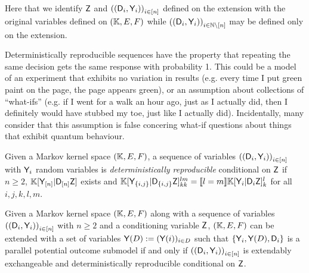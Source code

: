 Here that we identify $\mathsf{Z}$ and $\left((\mathsf{D}_i,\mathsf{Y}_i)\right)_{i\in [n]}$ defined on the extension with the original variables defined on $(\mathbb{K},E,F)$ while $\left((\mathsf{D}_i,\mathsf{Y}_i)\right)_{i\in \mathbb{N}\setminus[n]}$ may be defined only on the extension.

Deterministically reproducible sequences have the property that repeating the same decision gets the same response with probability 1. This could be a model of an experiment that exhibits no variation in results (e.g. every time I put green paint on the page, the page appears green), or an assumption about collections of ``what-ifs'' (e.g. if I went for a walk an hour ago, just as I actually did, then I definitely would have stubbed my toe, just like I actually did). Incidentally, many consider that this assumption is false concering what-if questions about things that exhibit quantum behaviour.

\begin{definition}
Given a Markov kernel space $(\mathbb{K},E,F)$, a sequence of variables $\left((\mathsf{D}_i,\mathsf{Y}_i)\right)_{i\in [n]}$ with $\mathsf{Y}_i$ random variables is \emph{deterministically reproducible} conditional on $\mathsf{Z}$ if $n\geq 2$, $\mathbb{K}[\mathsf{Y}_{[n]}|\mathsf{D}_{[n]}\mathsf{Z}]$ exists and $\mathbb{K}[\mathsf{Y}_{\{i,j\}}|\mathsf{D}_{\{i,j\}}\mathsf{Z}]_{kk}^{lm} = \llbracket l=m \rrbracket \mathbb{K}[\mathsf{Y}_{i}|\mathsf{D}_{i}\mathsf{Z}]_{k}^{l}$ for all $i,j,k,l,m$.
\end{definition}

\begin{theorem}\label{th:cfac_rep}
Given a Markov kernel space $(\mathbb{K},E,F)$ along with a sequence of variables $\left((\mathsf{D}_i,\mathsf{Y}_i)\right)_{i\in [n]}$ with $n\geq 2$ and a conditioning variable $\mathsf{Z}$, $(\mathbb{K},E,F)$ can be extended with a set of variables $\mathsf{Y}(D):=(\mathsf{Y}(i))_{i\in D}$ such that $\{\mathsf{Y}_i, \mathsf{Y}(D), \mathsf{D}_i\}$ is a parallel potential outcome submodel if and only if $\left((\mathsf{D}_i,\mathsf{Y}_i)\right)_{i\in [n]}$ is extendably exchangeable and deterministically reproducible conditional on $\mathsf{Z}$.
\end{theorem}


